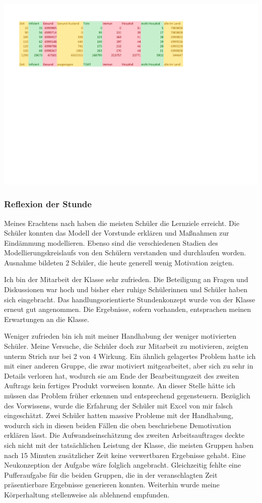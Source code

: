\includegraphics[width=\textwidth]{projekt/leistung_3_2}
\subsubsection{Reflexion der Stunde}
Meines Erachtens nach haben die meisten Schüler die Lernziele erreicht. Die Schüler konnten das Modell der Vorstunde erklären und Maßnahmen zur Eindämmung modellieren. Ebenso sind die verschiedenen Stadien des Modellierungskreislaufs von den Schülern verstanden und durchlaufen worden. Ausnahme bildeten 2 Schüler, die heute generell wenig Motivation zeigten. 

Ich bin der Mitarbeit der Klasse sehr zufrieden. Die Beteiligung an Fragen und Diskussionen war hoch und bisher eher ruhige Schülerinnen und Schüler haben sich eingebracht. Das handlungsorientierte Stundenkonzept wurde von der Klasse erneut gut angenommen. Die Ergebnisse, sofern vorhanden, entsprachen meinen Erwartungen an die Klasse.

Weniger zufrieden bin ich mit meiner Handhabung der weniger motivierten Schüler. Meine Versuche, die Schüler doch zur Mitarbeit zu motivieren, zeigten unterm Strich nur bei 2 von 4 Wirkung. Ein ähnlich gelagertes Problem hatte ich mit einer anderen Gruppe, die zwar motiviert mitgearbeitet, aber sich zu sehr in Details verloren hat, wodurch sie am Ende der Bearbeitungszeit des zweiten Auftrags kein fertiges Produkt vorweisen konnte. An dieser Stelle hätte ich müssen das Problem früher erkennen und entsprechend gegensteuern. Bezüglich des Vorwissens, wurde die Erfahrung der Schüler mit Excel von mir falsch eingeschätzt. Zwei Schüler hatten massive Probleme mit der Handhabung, wodurch sich in diesen beiden Fällen die oben beschriebene Demotivation erklären lässt. Die Aufwandseinschätzung des zweiten Arbeitsauftrages deckte sich nicht mit der tatsächlichen Leistung der Klasse, die meisten Gruppen haben nach 15 Minuten zusätzlicher Zeit keine verwertbaren Ergebnisse gehabt. Eine Neukonzeption der Aufgabe wäre folglich angebracht. Gleichzeitig fehlte eine Pufferaufgabe für die beiden Gruppen, die in der veranschlagten Zeit präsentierbare Ergebnisse generieren konnten. Weiterhin wurde meine Körperhaltung stellenweise als ablehnend empfunden. 

